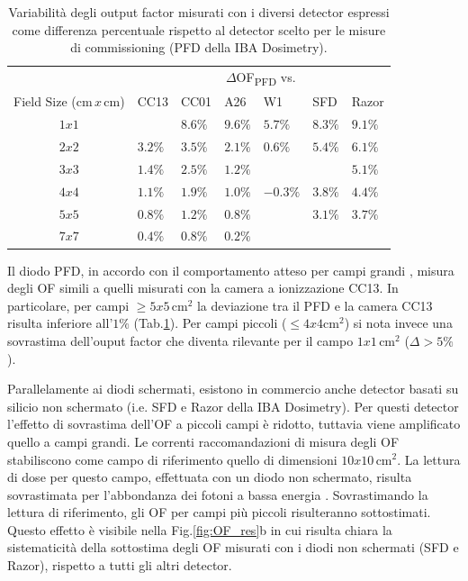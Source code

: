 \begin{table}
\centering
{}
\begin{tabular}{cllllll}
\toprule
  & \multicolumn{6}{c}{$\Delta$OF\textsubscript{PFD} vs.}\\
  \cmidrule{2-7}
 
Field Size (cm$\,x\,$cm) & CC13 & CC01 & A26 & W1 & SFD & Razor\\
\midrule
$1x1$ &        & $8.6\%$ & $9.6\%$ & $5.7\%$ & $8.3\%$ & $9.1\%$\\
$2x2$ & $3.2\%$ & $3.5\%$ & $2.1\%$ & $0.6\%$ & $5.4\%$ & $6.1\%$\\
$3x3$ & $1.4\%$ & $2.5\%$ & $1.2\%$ &  &      & $5.1\%$ \\
$4x4$ & $1.1\%$ & $1.9\%$ & $1.0\%$ & $-0.3\%$ & $3.8\%$ & $4.4\%$ \\
$5x5$ & $0.8\%$ & $1.2\%$ & $0.8\%$	&         & $3.1\%$ & $3.7\%$ \\
$7x7$ & $0.4\%$ & $0.8\%$ & $0.2\%$	&         &         &         \\
\bottomrule
\end{tabular}
\caption{Variabilità degli output factor misurati con i diversi detector espressi come differenza percentuale rispetto al detector scelto per le misure di commissioning (PFD della IBA Dosimetry).}
\label{tab:delta_OF}
\end{table}

Il diodo PFD, in accordo con il comportamento atteso per campi grandi \cite{Griessbach2005}, misura degli OF simili a quelli misurati con la camera a ionizzazione CC13. In particolare, per campi $\geq 5x5\,$cm$^2$ la deviazione tra il PFD e la camera CC13 risulta inferiore all'$1\%$ (Tab.\ref{tab:delta_OF}). Per campi piccoli ($\leq 4x4$cm$^2$) si nota invece una sovrastima dell'ouput factor che diventa rilevante per il campo $1x1\,$cm$^2$ ($\Delta > 5\%$ ).

Parallelamente ai diodi schermati, esistono in commercio anche detector basati su silicio non schermato (i.e. SFD e Razor della IBA Dosimetry). Per questi detector l'effetto di sovrastima dell'OF a piccoli campi è ridotto, tuttavia viene amplificato quello a campi grandi. Le correnti raccomandazioni di misura degli OF \cite{Andreo2006,RaySearchLaboratories2014} stabiliscono come campo di riferimento quello di dimensioni $10x10\,$cm$^2$. La lettura di dose per questo campo, effettuata con un diodo non schermato, risulta sovrastimata per l'abbondanza dei fotoni a bassa energia \cite{Griessbach2005}. Sovrastimando la lettura di riferimento, gli OF per campi più piccoli risulteranno sottostimati. Questo effetto è visibile nella Fig.\ref{fig:OF_res}b in cui risulta chiara la sistematicità della sottostima degli OF misurati con i diodi non schermati (SFD e Razor), rispetto a tutti gli altri detector.

